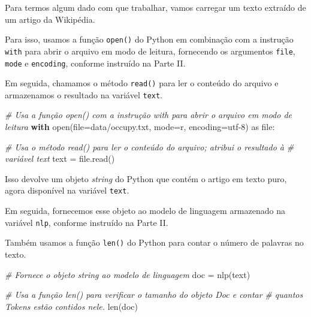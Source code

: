 \documentclass[
  brazilian,
]{article}
\newenvironment{Shaded}{}{}
\newcommand{\BuiltInTok}[1]{#1}
\newcommand{\CommentTok}[1]{\textcolor[rgb]{0.38,0.63,0.69}{\textit{#1}}}
\newcommand{\ControlFlowTok}[1]{\textcolor[rgb]{0.00,0.44,0.13}{\textbf{#1}}}
\newcommand{\ImportTok}[1]{#1}
\newcommand{\NormalTok}[1]{#1}
\newcommand{\OperatorTok}[1]{\textcolor[rgb]{0.40,0.40,0.40}{#1}}
\newcommand{\StringTok}[1]{\textcolor[rgb]{0.25,0.44,0.63}{#1}}
\begin{document}
Para termos algum dado com que trabalhar, vamos carregar um texto
extraído de um artigo da Wikipédia.

Para isso, usamos a função \texttt{open()} do Python em combinação com a
instrução \texttt{with} para abrir o arquivo em modo de leitura,
fornecendo os argumentos \texttt{file}, \texttt{mode} e
\texttt{encoding}, conforme instruído na Parte II.

Em seguida, chamamos o método \texttt{read()} para ler o conteúdo do
arquivo e armazenamos o resultado na variável \texttt{text}.

\begin{Shaded}
\begin{Highlighting}[]
\CommentTok{\# Usa a função open() com a instrução \textquotesingle{}with\textquotesingle{} para abrir o arquivo em modo de leitura}
\ControlFlowTok{with} \BuiltInTok{open}\NormalTok{(}\BuiltInTok{file}\OperatorTok{=}\StringTok{\textquotesingle{}data/occupy.txt\textquotesingle{}}\NormalTok{, mode}\OperatorTok{=}\StringTok{\textquotesingle{}r\textquotesingle{}}\NormalTok{, encoding}\OperatorTok{=}\StringTok{\textquotesingle{}utf{-}8\textquotesingle{}}\NormalTok{) }\ImportTok{as} \BuiltInTok{file}\NormalTok{:}

    \CommentTok{\# Usa o método read() para ler o conteúdo do arquivo; atribui o resultado à}
    \CommentTok{\# variável \textquotesingle{}text\textquotesingle{}}
\NormalTok{    text }\OperatorTok{=} \BuiltInTok{file}\NormalTok{.read()}
\end{Highlighting}
\end{Shaded}

Isso devolve um objeto \emph{string} do Python que contém o artigo em
texto puro, agora disponível na variável \texttt{text}.

Em seguida, fornecemos esse objeto ao modelo de linguagem armazenado na
variável \texttt{nlp}, conforme instruído na Parte II.

Também usamos a função \texttt{len()} do Python para contar o número de
palavras no texto.

\begin{Shaded}
\begin{Highlighting}[]
\CommentTok{\# Fornece o objeto string ao modelo de linguagem}
\NormalTok{doc }\OperatorTok{=}\NormalTok{ nlp(text)}

\CommentTok{\# Usa a função len() para verificar o tamanho do objeto Doc e contar}
\CommentTok{\# quantos Tokens estão contidos nele.}
\BuiltInTok{len}\NormalTok{(doc)}
\end{Highlighting}
\end{Shaded}
\end{document}

